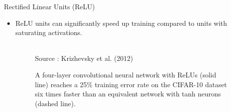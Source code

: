 \begin{frame} {Rectified Linear Units (ReLU)}
  \begin{itemize}
    \item ReLU units can significantly speed up training compared to units with saturating activations.
    \begin{figure}
    \centering
      \tiny{\\ Source : Krizhevsky et al. (2012)}
      \caption{\footnotesize A four-layer convolutional neural network with ReLUs (solid line) reaches a 25\% 
training error rate on the CIFAR-10 dataset six times faster than an equivalent network with tanh neurons (dashed line). }
    \end{figure}
  \end{itemize}
\end{frame}

